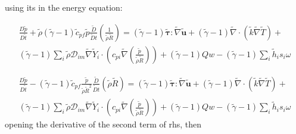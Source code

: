 \documentclass[preprint,12pt,authoryear]{elsarticle}
\begin{document}
using its in the energy equation:  

\begin{equation}
\begin{split}
        \frac{D \tilde{p}}{D\tilde{t}}
	+
        \tilde{\rho}
	(\tilde{\gamma}-1)
        \tilde{c}_{pf}
        \tilde{p} 
        \frac{\tilde{D}}{\tilde{D} t}
        \left(
                \frac{1}{\tilde{\rho}\tilde{R}}
        \right)
        =
	(\tilde{\gamma}-1)
        \pmb{\tilde{\tau}}:\tilde{\nabla} \tilde{\mathbf{u}} 
	+
	(\tilde{\gamma}-1)
        \tilde{\nabla} \cdot (\tilde{k}\tilde{\nabla} \tilde{T})
        +
	\\
	(\tilde{\gamma}-1)
        \sum\limits_i 
        \tilde{\rho}
        \mathcal{D}_{im}
        \tilde{\nabla}
        \tilde{Y}_i     
        \cdot
        \left(
                c_{pi}
                \tilde{\nabla}
                \left(
                	\frac{\tilde{p}}{\tilde{\rho}\tilde{R}}
                \right)
        \right)
	+
	(\tilde{\gamma}-1)
	Qw
	-
	(\tilde{\gamma}-1)
        \sum\limits_i
	\tilde{h}_i
        s_i \omega	
\end{split}
\end{equation}

\begin{equation}
\begin{split}
        \frac{D \tilde{p}}{D\tilde{t}}
	-
	(\tilde{\gamma}-1)
        \tilde{c}_{pf}
	\frac{ \tilde{p} }{\tilde{\rho}\tilde{R}^2}
        \frac{\tilde{D}}{\tilde{D} t}
	(
	\tilde{\rho}\tilde{R}
	)
        =
	(\tilde{\gamma}-1)
        \pmb{\tilde{\tau}}:\tilde{\nabla} \tilde{\mathbf{u}} 
        + 
	(\tilde{\gamma}-1)
        \tilde{\nabla} \cdot (\tilde{k}\tilde{\nabla} \tilde{T})
        +
	\\
	(\tilde{\gamma}-1)
        \sum\limits_i 
        \tilde{\rho}
        \mathcal{D}_{im}
        \tilde{\nabla}
        \tilde{Y}_i     
        \cdot
        \left(
                c_{pi}
                \tilde{\nabla}
                \left(
                	\frac{\tilde{p}}{\tilde{\rho}\tilde{R}}
                \right)
        \right)
	+
	(\tilde{\gamma}-1)
	Qw
	-
	(\tilde{\gamma}-1)
        \sum\limits_i
	\tilde{h}_i
        s_i \omega	
\end{split}
\end{equation}
opening the derivative of the second term of rhs, then 
\end{document}
